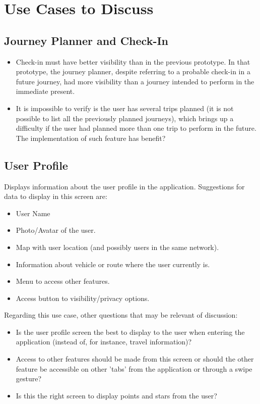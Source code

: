 \section{Use Cases to Discuss}

\subsection{Journey Planner and Check-In}

\begin{itemize}
\item Check-in must have better visibility than in the previous prototype. In that prototype, the journey planner, despite referring to a probable check-in in a future journey, had more visibility than a journey intended to perform in the immediate present.

\item It is impossible to verify is the user has several trips planned (it is not possible to list all the previously planned journeys), which brings up a difficulty if the user had planned more than one trip to perform in the future. The implementation of such feature has benefit?
\end{itemize}

\subsection{User Profile}

Displays information about the user profile in the application. Suggestions for data to display in this screen are:

\begin{itemize}

\item User Name
\item Photo/Avatar of the user.
\item Map with user location (and possibly users in the same network).
\item Information about vehicle or route where the user currently is.
\item Menu to access other features.
\item Access button to visibility/privacy options.

\end{itemize}

Regarding this use case, other questions that may be relevant of discussion:

\begin{itemize}
\item Is the user profile screen the best to display to the user when entering the application (instead of, for instance, travel information)?
\item Access to other features should be made from this screen or should the other feature be accessible on other 'tabs' from the application or through a swipe gesture?
\item Is this the right screen to display points and stars from the user?
\end{itemize}

